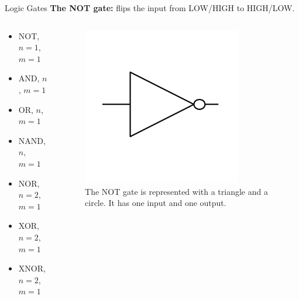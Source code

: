 \documentclass{beamer}
\begin{document}
\begin{frame}{Logic Gates}
\textbf{The NOT gate:} flips the input from LOW/HIGH to HIGH/LOW. \\ \vspace{0.5cm}
\begin{columns}[T]
\begin{column}{0.5\textwidth}
\begin{itemize}
\item \alert{NOT, $n=1$, $m=1$}
\item AND, $n$, $m=1$
\item OR, $n$, $m=1$
\item NAND, $n$, $m=1$
\item NOR, $n=2$, $m=1$
\item XOR, $n=2$, $m=1$
\item XNOR, $n=2$, $m=1$
\end{itemize}
\end{column}
\begin{column}{0.5\textwidth}
\begin{figure}
\centering
\includegraphics[width=0.8\textwidth,trim=0cm 2cm 0cm 2cm,clip=true]{figures/BasicNot.pdf}
\caption{\label{fig:not} The NOT gate is represented with a triangle and a circle.  It has one input and one output.}
\end{figure}
\end{column}
\end{columns}
\end{frame}
\end{document}
